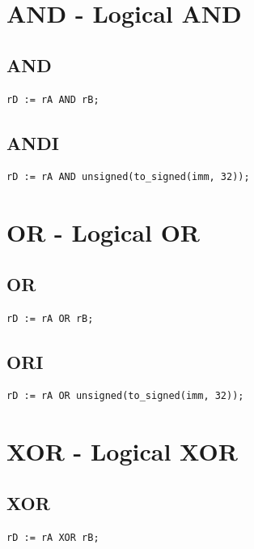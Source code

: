 \documentclass{UoYCSproject}
\begin{document}
\section{AND - Logical AND}

\subsection{AND}

\begin{lstlisting}
rD := rA AND rB;
\end{lstlisting}

\subsection{ANDI}

\begin{lstlisting}
rD := rA AND unsigned(to_signed(imm, 32));
\end{lstlisting}

\section{OR - Logical OR}

\subsection{OR}

\begin{lstlisting}
rD := rA OR rB;
\end{lstlisting}

\subsection{ORI}

\begin{lstlisting}
rD := rA OR unsigned(to_signed(imm, 32));
\end{lstlisting}

\section{XOR - Logical XOR}

\subsection{XOR}

\begin{lstlisting}
rD := rA XOR rB;
\end{lstlisting}
\end{document}

